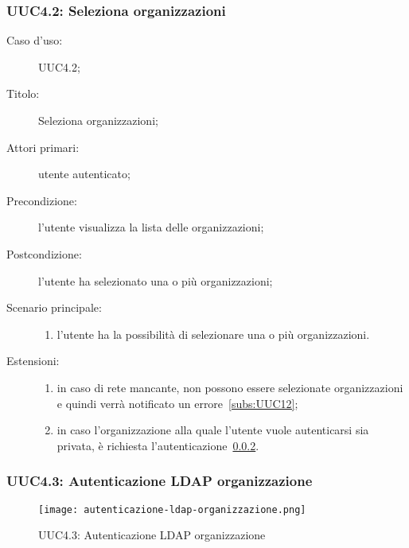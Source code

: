 \documentclass[../../../analisi-dei-requisiti.tex]{subfiles}
\begin{document}
\subsubsection{UUC4.2: Seleziona organizzazioni}%
\label{subs:UUC4.2}
\begin{description}
  \item[Caso d’uso:] UUC4.2;
  \item[Titolo:] Seleziona organizzazioni;
  \item[Attori primari:] utente autenticato;
  \item[Precondizione:] l'utente visualizza la lista delle organizzazioni;
  \item[Postcondizione:] l'utente ha selezionato una o più organizzazioni;
  \item[Scenario principale:]
        \begin{enumerate}
          \item l'utente ha la possibilità di selezionare una o più organizzazioni.
        \end{enumerate}
  \item[Estensioni:]
        \begin{enumerate}
          \item in caso di rete mancante, non possono essere selezionate organizzazioni e quindi verrà notificato un errore~\ref{subs:UUC12};
          \item in caso l'organizzazione alla quale l'utente vuole autenticarsi sia privata, è richiesta l'autenticazione~\ref{subs:UUC4.3}.
        \end{enumerate}
\end{description}

\subsubsection{UUC4.3: Autenticazione LDAP organizzazione}%
\label{subs:UUC4.3}

\begin{figure}[H]
  \centering
  \texttt{[image: autenticazione-ldap-organizzazione.png]}
  \caption{UUC4.3: Autenticazione LDAP organizzazione}%
  \label{fig:uuc4.3}
\end{figure}
\end{document}
